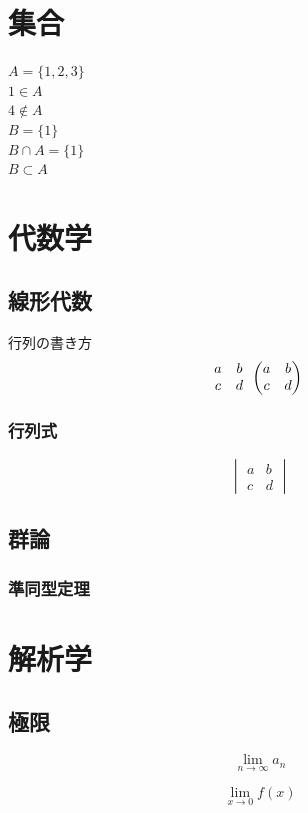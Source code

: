 \documentclass[11pt,a4j]{jreport}
\begin{document}
\chapter{集合}
\thispagestyle{fancy}
\noindent
$A=\{1,2,3\}$ \\
$1 \in A$ \\
$4 \notin A$ \\
$B=\{1\}$ \\
$B \cap A=\{1\}$ \\
$B \subset A$ \\

\chapter{代数学}
\thispagestyle{fancy}
\section{線形代数}
行列の書き方\\
\[
\begin{matrix}
    a & b \\
    c & d
\end{matrix}\\
\begin{pmatrix}
    a & b \\
    c & d
\end{pmatrix}\\
\]
\subsection{行列式}
\[
\begin{vmatrix}
    a & b \\
    c & d
\end{vmatrix}
\]

\section{群論}
\subsection{準同型定理}


\chapter{解析学}
\thispagestyle{fancy}
\section{極限}
\[
\lim_{n\to\infty}a_{n}
\]

\[
\lim_{x\to0}f(x)
\]
\end{document}
